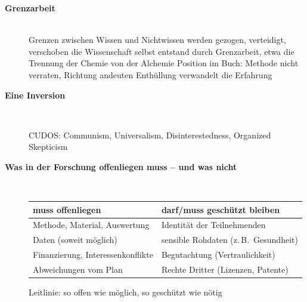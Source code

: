 \begin{description}
\item[{\rot\bf Grenzarbeit}]~\\[-\lblskip]
\bi
  \ite Grenzen zwischen Wissen und Nichtwissen werden gezogen, verteidigt,
    verschoben \parencite{gieryn1983boundary}
  \ite die Wissenschaft selbst entstand durch Grenzarbeit, etwa die
    Trennung der Chemie von der Alchemie \parencite{newmanprincipe2002}
  \ite Position im Buch: Methode nicht verraten, Richtung andeuten
  \ite Enthüllung verwandelt die Erfahrung
    \parencite{dufourmantelle2021geheimnis}
\ei
\os{\newpage}

\item[{\rot\bf Eine Inversion}]~\\[-\lblskip]
\begin{center}
\end{center}
\bi
  \ite CUDOS: Communism, Universalism, Disinterestedness, Organized
    Skepticism \parencite{merton1973normative}
\ei
\os{\newpage}

\item[{\rot\bf Was in der Forschung offenliegen muss -- und was nicht}]~\\[-\lblskip]
\begin{center}\nsl{\small}
\begin{tabular}{p{}p{}}
\toprule
\textbf{muss offenliegen} & \textbf{darf/muss geschützt bleiben} \\
\midrule
Methode, Material, Auswertung & Identität der Teilnehmenden \\
Daten (soweit möglich) & sensible Rohdaten (z.\,B.\ Gesundheit) \\
Finanzierung, Interessenkonflikte & Begutachtung (Vertraulichkeit) \\
Abweichungen vom Plan & Rechte Dritter (Lizenzen, Patente) \\
\bottomrule
\end{tabular}
\end{center}
\bi
  \ite Leitlinie: so offen wie möglich, so geschützt wie nötig
\ei
\os{\newpage}
\end{description}

